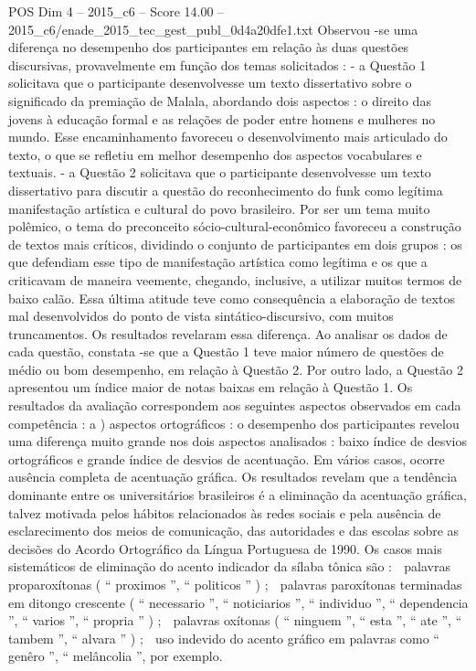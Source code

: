 \begin{textsample}{POS Dim 4 – 2015\_c6 – Score 14.00 – 2015\_c6/enade\_2015\_tec\_gest\_publ\_0d4a20dfe1.txt}
Observou -se uma diferença no desempenho dos participantes em relação às duas questões discursivas, provavelmente em função dos temas solicitados : - a Questão 1 solicitava que o participante desenvolvesse um texto dissertativo sobre o significado da premiação de Malala, abordando dois aspectos : o direito das jovens à educação formal e as relações de poder entre homens e mulheres no mundo.
Esse encaminhamento favoreceu o desenvolvimento mais articulado do texto, o que se refletiu em melhor desempenho dos aspectos vocabulares e textuais. - a Questão 2 solicitava que o participante desenvolvesse um texto dissertativo para discutir a questão do reconhecimento do funk como legítima manifestação artística e cultural do povo brasileiro.
Por ser um tema muito polêmico, o tema do preconceito sócio-cultural-econômico favoreceu a construção de textos mais críticos, dividindo o conjunto de participantes em dois grupos : os que defendiam esse tipo de manifestação artística como legítima e os que a criticavam de maneira veemente, chegando, inclusive, a utilizar muitos termos de baixo calão.
Essa última atitude teve como consequência a elaboração de textos mal desenvolvidos do ponto de vista sintático-discursivo, com muitos truncamentos.
Os resultados revelaram essa diferença.
Ao analisar os dados de cada questão, constata -se que a Questão 1 teve maior número de questões de médio ou bom desempenho, em relação à Questão 2.
Por outro lado, a Questão 2 apresentou um índice maior de notas baixas em relação à Questão 1.
Os resultados da avaliação correspondem aos seguintes aspectos observados em cada competência : a ) aspectos ortográficos : o desempenho dos participantes revelou uma diferença muito grande nos dois aspectos analisados : baixo índice de desvios ortográficos e grande índice de desvios de acentuação.
Em vários casos, ocorre ausência completa de acentuação gráfica.
Os resultados revelam que a tendência dominante entre os universitários brasileiros é a eliminação da acentuação gráfica, talvez motivada pelos hábitos relacionados às redes sociais e pela ausência de esclarecimento dos meios de comunicação, das autoridades e das escolas sobre as decisões do Acordo Ortográfico da Língua Portuguesa de 1990.
Os casos mais sistemáticos de eliminação do acento indicador da sílaba tônica são :  palavras proparoxítonas ( “ proximos ”, “ politicos ” ) ;  palavras paroxítonas terminadas em ditongo crescente ( “ necessario ”, “ noticiarios ”, “ individuo ”, “ dependencia ”, “ varios ”, “ propria ” ) ;  palavras oxítonas ( “ ninguem ”, “ esta ”, “ ate ”, “ tambem ”, “ alvara ” ) ;  uso indevido do acento gráfico em palavras como “ genêro ”, “ melâncolia ”, por exemplo.

\end{textsample}
